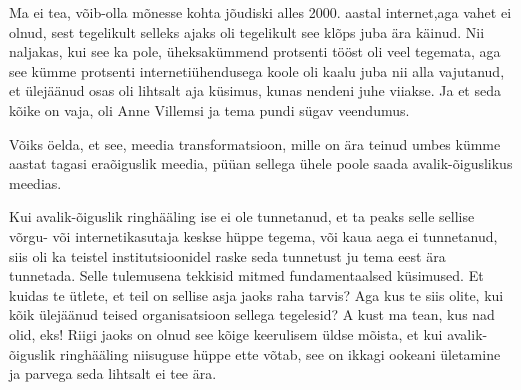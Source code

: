 
Ma ei tea, võib-olla mõnesse kohta jõudiski alles 2000. aastal internet,aga 
vahet ei olnud, sest tegelikult selleks ajaks oli tegelikult see klõps juba 
ära käinud. Nii naljakas, kui see ka pole, üheksakümmend protsenti tööst oli 
veel tegemata, aga see kümme protsenti internetiühendusega koole oli kaalu juba 
nii alla vajutanud, et  ülejäänud osas oli lihtsalt aja küsimus, kunas nendeni 
juhe viiakse. Ja et seda kõike on vaja, oli Anne Villemsi ja tema pundi sügav veendumus. 


Võiks öelda, et see, meedia transformatsioon, mille on ära teinud umbes kümme 
aastat tagasi eraõiguslik meedia, püüan sellega ühele poole saada 
avalik-õiguslikus meedias.


Kui avalik-õiguslik ringhääling ise ei ole 
tunnetanud, et ta peaks selle  sellise
võrgu- või internetikasutaja keskse hüppe tegema, või  kaua aega ei tunnetanud, 
siis oli ka teistel institutsioonidel  raske seda tunnetust ju tema eest ära 
tunnetada. Selle tulemusena  tekkisid mitmed fundamentaalsed küsimused. Et 
kuidas te ütlete, et teil on sellise asja jaoks raha tarvis? Aga kus te siis 
olite, kui kõik ülejäänud teised organisatsioon sellega tegelesid? A kust ma 
tean, kus nad olid, eks! Riigi jaoks on olnud see kõige keerulisem  üldse 
mõista, et kui avalik-õiguslik ringhääling niisuguse hüppe ette võtab, see on 
ikkagi ookeani ületamine ja parvega seda lihtsalt ei tee ära.


